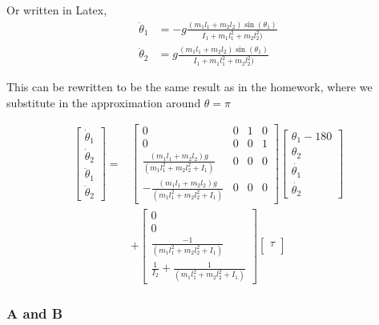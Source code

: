\documentclass[conference]{IEEEtran}
\begin{document}
Or written in Latex,
\begin{align}
    \ddot \theta_1 &= -g \frac{(m_1 l_1 + m_2 l_2) \sin(\theta_1) } 
    {I_1 + m_1 l_1^2 + m_2 l_2^2)} \\
    \ddot \theta_2 &= g \frac{(m_1 l_1 + m_2 l_2) \sin(\theta_1) } 
    {I_1 + m_1 l_1^2 + m_2 l_2^2)}
\end{align}


This can be rewritten to be the same result as in the homework, where we
substitute in the approximation around $\theta = \pi$

\begin{align}
    \begin{bmatrix}
        \dot\theta_1 \\
        \dot\theta_2 \\
        \ddot\theta_1 \\
        \ddot\theta_2
    \end{bmatrix}
    =&
    \begin{bmatrix}
        0 & 0 & 1 & 0 \\
        0 & 0 & 0 & 1 \\
        \frac{(m_1 l_1 + m_2 l_2) g}{(m_1 l_1^2 + m_2 l_2^2 + I_1)} & 0 & 0 & 0 \\
        - \frac{(m_1 l_1 + m_2 l_2) g}{(m_1 l_1^2 + m_2 l_2^2 + I_1)}  & 0 & 0 & 0
    \end{bmatrix}
    \begin{bmatrix}
        \theta_1 - 180 \\
        \theta_2 \\
        \dot{\theta_1} \\
        \dot{\theta_2}
    \end{bmatrix} \nonumber \\
    &+
    \begin{bmatrix}
        0 \\
        0 \\
        \frac{-1}{(m_1 l_1^2 + m_2 l_2^2 + I_1)} \\
        \frac{1}{I_2} + \frac{1}{(m_1 l_1^2 + m_2 l_2^2 + I_1)}
    \end{bmatrix}
    \begin{bmatrix}
        \tau \\
    \end{bmatrix}
\end{align}

\subsubsection{A and B}
\end{document}
